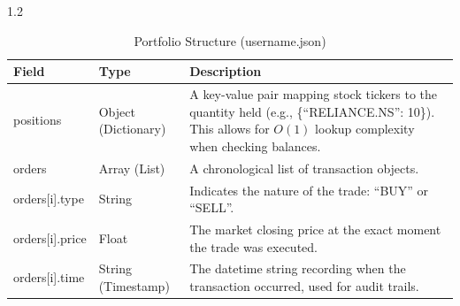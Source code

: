 \documentclass[12pt, a4paper]{report}
\begin{document}
\begin{spacing}{1.2}
\begin{table}[h]
    \centering
    \caption{Portfolio Structure (username.json)}
    \begin{tabular}{|p{3cm}|p{3cm}|p{8cm}|}
        \hline
        \textbf{Field} & \textbf{Type} & \textbf{Description} \\
        \hline
        positions & Object (Dictionary) & A key-value pair mapping stock tickers to the quantity held (e.g., \{``RELIANCE.NS'': 10\}). This allows for $O(1)$ lookup complexity when checking balances. \\
        \hline
        orders & Array (List) & A chronological list of transaction objects. \\
        \hline
        orders[i].type & String & Indicates the nature of the trade: ``BUY'' or ``SELL''. \\
        \hline
        orders[i].price & Float & The market closing price at the exact moment the trade was executed. \\
        \hline
        orders[i].time & String (Timestamp) & The datetime string recording when the transaction occurred, used for audit trails. \\
        \hline
    \end{tabular}
\end{table}


\end{spacing}
\end{document}
